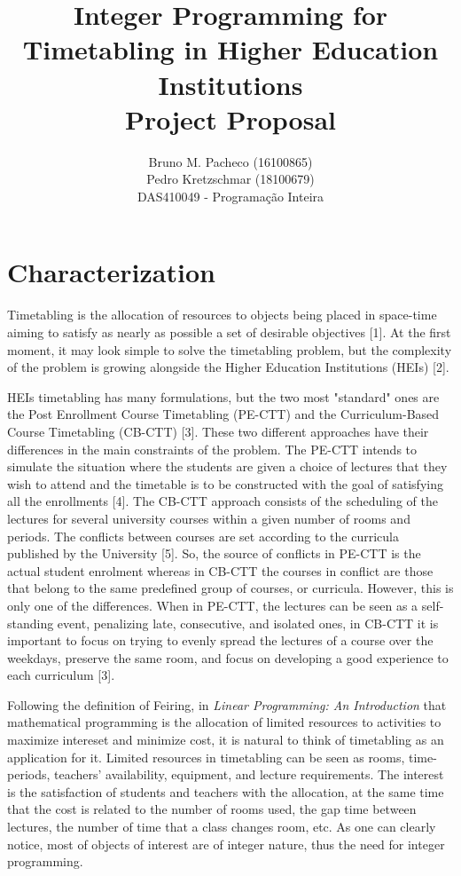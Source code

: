 \documentclass[a4paper]{report}
\begin{document}
 
\title{Integer Programming for Timetabling in Higher Education Institutions\\Project Proposal}
\author{Bruno M. Pacheco (16100865)\\
Pedro Kretzschmar (18100679) \\
DAS410049 - Programação Inteira}
 
\maketitle

\section*{Characterization}

Timetabling is the allocation of resources to objects being placed in space-time aiming to satisfy as nearly as possible a set of desirable objectives [1]. At the first moment, it may look simple to solve the timetabling problem, but the complexity of the problem is growing alongside the Higher Education Institutions (HEIs) [2].

HEIs timetabling has many formulations, but the two most "standard" ones are the Post Enrollment Course Timetabling (PE-CTT) and the Curriculum-Based Course Timetabling (CB-CTT) [3]. These two different approaches have their differences in the main constraints of the problem.
The PE-CTT intends to simulate the situation where the students are given a choice of lectures that they wish to attend and the timetable is to be constructed with the goal of satisfying all the enrollments [4].
The CB-CTT approach consists of the scheduling of the lectures for several university courses within a given number of rooms and periods. The conflicts between courses are set according to the curricula published by the University [5]. So, the source of conflicts in PE-CTT is the actual student enrolment whereas in CB-CTT the courses in conflict are those that belong to the same predefined group of courses, or curricula.
However, this is only one of the differences. When in PE-CTT, the lectures can be seen as a self-standing event, penalizing late, consecutive, and isolated ones, in CB-CTT it is important to focus on trying to evenly spread the lectures of a course over the weekdays, preserve the same room, and focus on developing a good experience to each curriculum [3].

Following the definition of Feiring, in \emph{Linear Programming: An Introduction} that mathematical programming is the allocation of limited resources to activities to maximize intereset and minimize cost, it is natural to think of timetabling as an application for it. Limited resources in timetabling can be seen as rooms, time-periods, teachers' availability, equipment, and lecture requirements. The interest is the satisfaction of students and teachers with the allocation, at the same time that the cost is related to the number of rooms used, the gap time between lectures, the number of time that a class changes room, etc. As one can clearly notice, most of objects of interest are of integer nature, thus the need for integer programming.
 
\end{document}
